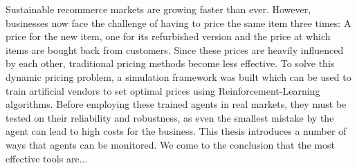 Sustainable recommerce markets are growing faster than ever. However, businesses now face the challenge of having to price the same item three times: A price for the new item, one for its refurbished version and the price at which items are bought back from customers. Since these prices are heavily influenced by each other, traditional pricing methods become less effective. To solve this dynamic pricing problem, a simulation framework was built which can be used to train artificial vendors to set optimal prices using Reinforcement-Learning algorithms.
Before employing these trained agents in real markets, they must be tested on their reliability and robustness, as even the smallest mistake by the agent can lead to high costs for the business. This thesis introduces a number of ways that agents can be monitored. We come to the conclusion that the most effective tools are...  